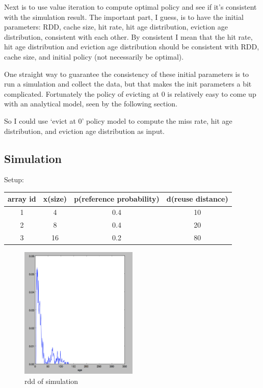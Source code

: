 \documentclass[12pt, letterpaper]{article}
\begin{document}
Next is to use value iteration to compute optimal policy and see if it's
consistent with the simulation result. The important part, I guess, is to have
the initial parameters: RDD, cache size, hit rate, hit age distribution,
eviction age distribution, consistent with each other. By consistent I mean that
the hit rate, hit age distribution and eviction age distribution should be
consistent with RDD, cache size, and initial policy (not necessarily be
optimal). 

One straight way to guarantee the consistency of these initial parameters is to
run a simulation and collect the data, but that makes the init parameters a bit
complicated. Fortunately the policy of evicting at 0 is relatively easy to come
up with an analytical model, seen by the following section.

So I could use `evict at 0' policy model to compute the miss rate, hit age
distribution, and eviction age distribution as input.

\subsection{Simulation}

Setup:
\begin{center}
\begin{tabular}{ c | c c c}
\hline
array id & x(size) & p(reference probability) & d(reuse distance) \\
\hline
1 & 4 & 0.4 & 10 \\
2 & 8 & 0.4 & 20 \\
3 & 16 & 0.2 & 80 \\
\hline
\end{tabular}
\end{center}

\begin{figure}[H]
\centering
\includegraphics[width=0.5\textwidth]{trimodal-rdd-random-1.png}
\caption{rdd of simulation}
\end{figure}
\end{document}

